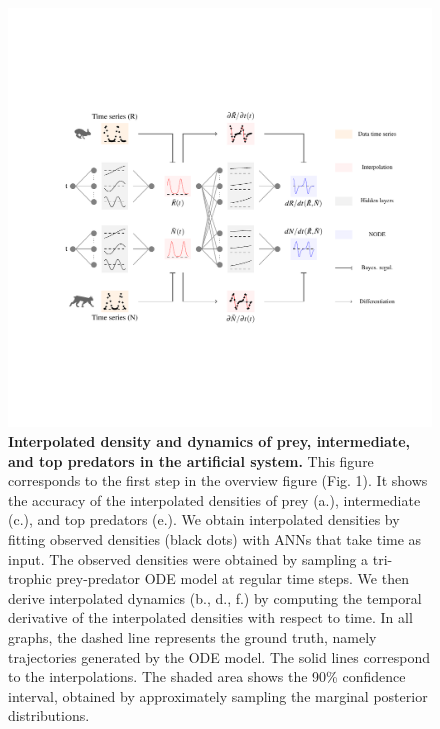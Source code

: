 \documentclass[11pt, oneside]{article}
\begin{document}
\newpage
\begin{figure}[H]
\begin{center}
\includegraphics[width=\linewidth,page=2]{figures/main.pdf}
\caption{
    \textbf{Interpolated density and dynamics of prey, intermediate, and top predators in the artificial system.}
    This figure corresponds to the first step in the overview figure (Fig. 1).
    It shows the accuracy of the interpolated densities of prey (a.), intermediate (c.), and top predators (e.).
    We obtain interpolated densities by fitting observed densities (black dots) with ANNs that take time as input.
    The observed densities were obtained by sampling a tri-trophic prey-predator ODE model at regular time steps.
    We then derive interpolated dynamics (b., d., f.) by computing the temporal derivative of the interpolated densities with respect to time.
    In all graphs, the dashed line represents the ground truth, namely trajectories generated by the ODE model.
    The solid lines correspond to the interpolations. 
    The shaded area shows the 90\% confidence interval, obtained by approximately sampling the marginal posterior distributions. 
}
\end{center}
\end{figure}
\newpage
\end{document}
